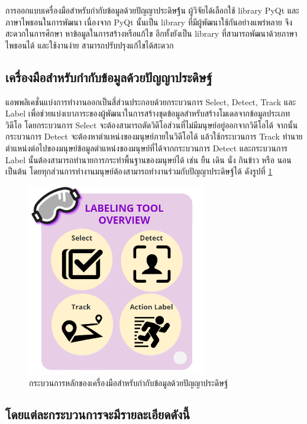 การออกแบบเครื่องมือสำหรับกำกับข้อมูลด้วยปัญญาประดิษฐ์้น ผู้วิจัยได้เลือกใช้ library PyQt และภาษาไพธอนในการพัฒนา
เนื่องจาก PyQt นั้นเป็น library ที่มีผู้พัฒนาใช้กันอย่างแพร่หลาย จึงสะดวกในการศึกษา หาข้อมูลในการสร้างหรือแก้ไข
อีกทั้งยังเป็น library ที่สามารถพัฒนาด้วยภาษาไพธอนได้ และใช้งานง่าย สามารถปรับปรุงแก้ไขได้สะดวก

\subsection{เครื่องมือสำหรับกำกับข้อมูลด้วยปัญญาประดิษฐ์}
แอพพลิเคชั่นแบ่งการทำงานออกเป็นสี่ส่วนประกอบด้วยกระบวนการ Select, Detect, Track และ Label
เพื่อช่วยแบ่งเบาภาระของผู้พัฒนาในการสร้างชุดข้อมูลสำหรับสร้างโมเดลจากข้อมูลประเภทวิดีโอ โดยกระบวนการ Select
จะต้องสามารถตัดวิดีโอส่วนที่ไม่มีมนุษย์อยู่ออกจากวิดีโอได้ จากนั้นกระบวนการ Detect จะต้องหาตำแหน่งของมนุษย์ภายในวิดีโอได้
แล้วใช้กระบวนการ Track ทำนายตำแหน่งต่อไปของมนุษย์ข้อมูลตำแหน่งของมนุษย์ที่ได้จากกระบวนการ Detect
และกระบวนการ Label นั้นต้องสามารถทำนายการกระทำพื้นฐานของมนุษย์ได้ เช่น ยืน เดิน นั่ง กินข้าว หรือ นอน เป็นต้น 
โดยทุกส่วนการทำงานมนุษย์ต้องสามารถทำงานร่วมกับปัญญาประดิษฐ์ได้
ดังรูปที่ \ref{fig:labeling_overview}

\begin{figure}[!ht]
    \centering
    \includegraphics[width=0.7\textwidth]{chapter3/images/3_6/labelingToolOverview.png}
    \caption{กระบวนการหลักของเครื่องมือสำหรับกำกับข้อมูลด้วยปัญญาประดิษฐ์}
    \label{fig:labeling_overview}
\end{figure}
\clearpage

\subsection*{โดยแต่ละกระบวนการจะมีรายละเอียดดังนี้}
